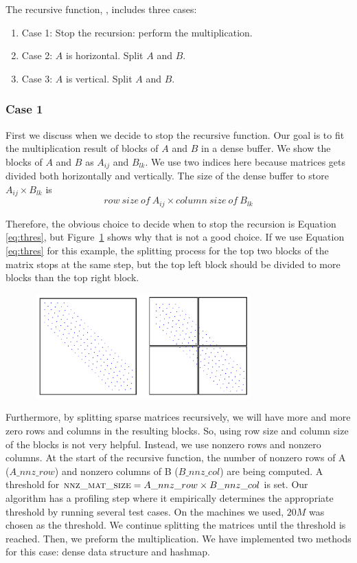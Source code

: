 The recursive function, \recmm, includes three cases:
\begin{enumerate}
 \item Case 1: Stop the recursion: perform the multiplication.
 \item Case 2: $A$ is horizontal. Split $A$ and $B$.
 \item Case 3: $A$ is vertical. Split $A$ and $B$.
\end{enumerate}

\subsubsection{Case 1}
\label{sec:case1}
First we discuss when we decide to stop the recursive function.  
Our goal is to fit the multiplication result of blocks of $A$ and $B$ in a dense buffer. We show the blocks of $A$ and $B$ as $A_{ij}$ and $B_{lk}$. We use two indices here because matrices gets divided both horizontally and vertically. The size of the dense buffer to store $A_{ij} \times B_{lk}$ is
\begin{equation}
    row\ size\ of\ A_{ij} \times column\ size\ of\ B_{lk}\label{eq:thres}
\end{equation}

Therefore, the obvious choice to decide when to stop the recursion is Equation~ \eqref{eq:thres}, but Figure~\ref{fig:thres} shows why that is not a good choice. If we use Equation~ \eqref{eq:thres} for this example, the splitting process for the top two blocks of the matrix stops at the same step, but the top left block should be divided to more blocks than the top right block.

\begin{figure}[tbh]
 \centering
 \includegraphics[width=8.5cm,height=4cm]{./figures/split3.pdf}
 \caption{}
 \label{fig:thres}
 \Description{}
\end{figure}

Furthermore, by splitting sparse matrices recursively, we will have more and more zero rows and columns in the resulting blocks. So, using row size and column size of the blocks is not very helpful. Instead, we use nonzero rows and nonzero columns.
At the start of the recursive function, the number of nonzero rows of A ($A\_nnz\_row$) and nonzero columns of B ($B\_nnz\_col$) are being computed. A threshold for $\textsc{nnz\_mat\_size} = A\_nnz\_row \times B\_nnz\_col$ is set. Our algorithm has a profiling step where it empirically determines the appropriate threshold by running several test cases. On the machines we used,  $20M$ was chosen as the threshold. We continue splitting the matrices until the threshold is reached. Then, we preform the multiplication. We have implemented two methods for this case: dense data structure and hashmap.

